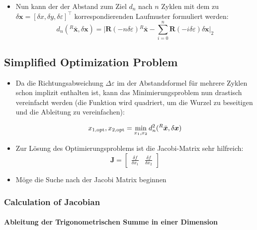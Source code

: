 \documentclass[10pt,a4paper]{article}
\begin{document}
\begin{itemize}
	
	\item Nun kann der der Abstand zum Ziel $d_n$ nach $n$ Zyklen mit dem zu $\delta\bm{x} = [\delta x, \delta y, \delta \varepsilon]^\top$ korrespondierenden Laufmuster formuliert werden:
	\begin{equation}
	d_n({^R}\bar{\bm{x}}, \delta\bm{x}) = \bigg| \bm{R}(-n \delta\varepsilon){^R}\bar{\bm{x}} - \sum_{i=0}^n \bm{R}(- i \delta\varepsilon) \delta \bm{x} \bigg|_2
	\end{equation}
	
\end{itemize}

\subsection{Simplified Optimization Problem}

\begin{itemize}

	\item Da die Richtungsabweichung $\Delta \varepsilon$ im der Abstandsformel für mehrere Zyklen schon implizit enthalten ist, kann das Minimierungsproblem nun drastisch vereinfacht werden (die Funktion wird quadriert, um die Wurzel zu beseitigen und die Ableitung zu vereinfachen):
	
	\begin{equation}
	x_{1, \textnormal{opt}}, x_{2, \textnormal{opt}} = \min_{x_1, x_2} d^2_n({^R}\bar{\bm{x}}, \delta\bm{x})
	\end{equation}
	
	\item Zur Lösung des Optimierungsproblems ist die Jacobi-Matrix sehr hilfreich:
	\begin{equation}
	\bm{{J}} = \begin{bmatrix}
		\frac{\delta f}{\delta x_1} &
		\frac{\delta f}{\delta x_2}
	\end{bmatrix}
	\end{equation}

	\item Möge die Suche nach der Jacobi Matrix beginnen
\end{itemize}

\subsubsection{Calculation of Jacobian}



\paragraph{Ableitung der Trigonometrischen Summe in einer Dimension}
\end{document}
